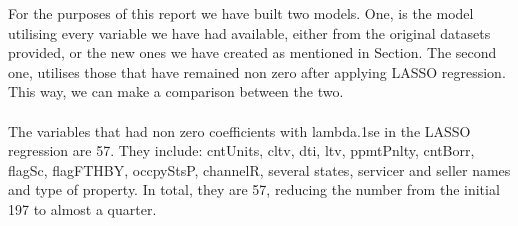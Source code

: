 For the purposes of this report we have built two models. One, is the model 
utilising every variable we have had available, either from the original 
datasets provided, or the new ones we have created as mentioned in Section. 
The second one, utilises those that have remained non zero after applying 
LASSO regression. This way, we can make a comparison between the two.
\\\\
The variables that had non zero coefficients with lambda.1se in the LASSO 
regression are 57. They include: cntUnits, cltv, dti, ltv, ppmtPnlty, 
cntBorr, flagSc, flagFTHBY, occpyStsP, channelR, several states, servicer 
and seller names and type of property. In total, they are 57, reducing the 
number from the initial 197 to almost a quarter. 


    
% 
% 
